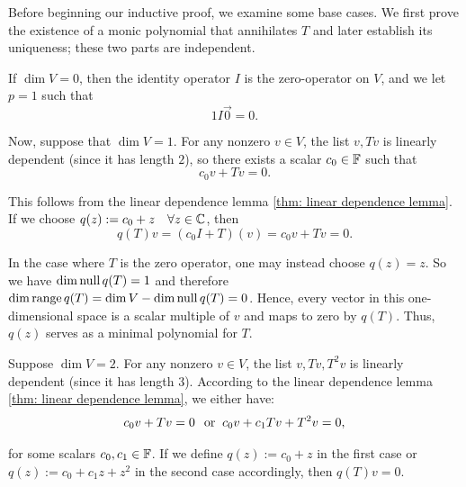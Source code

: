 \begin{prf}
  Before beginning our inductive proof, we examine some base cases. We first prove the existence of a monic polynomial that annihilates $T$ and later establish its uniqueness; these two parts are independent.


   If $\dim V=0$, then the identity operator $I$ is the zero-operator on $V$, and we let $p=1$ such that
  \begin{equation}
      1I\vec0=0.
  \end{equation}

   Now, suppose that $\dim V=1$. For any nonzero $v \in V$, the list $v, Tv$ is linearly dependent (since it has length $2$), so there exists a scalar $c_0 \in \mathbb{F}$ such that
  \begin{equation}
    c_0v + Tv = 0.
  \end{equation}

  This follows from the linear dependence lemma \ref{thm: linear dependence lemma}. If we choose $q(z) := c_0+z \quad \forall z \in \mathbb{C}$, then
  \begin{equation}
    q(T)v=(c_0 I+T)(v)=c_0v+Tv=0.
  \end{equation}

  In the case where $T$ is the zero operator, one may instead choose $q(z) = z$. So we have $\dim \operatorname{null} q(T) = 1$ and therefore $\dim \operatorname{range} q(T) = \dim V - \dim \operatorname{null} q(T) = 0$. Hence, every vector in this one-dimensional space is a scalar multiple of $v$ and maps to zero by $q(T)$. Thus, $q(z)$ serves as a minimal polynomial for $T$.

   Suppose $\dim V=2$. For any nonzero $v \in V$, the list $v, Tv, T^2v$ is linearly dependent (since it has length $3$). According to the linear dependence lemma \ref{thm: linear dependence lemma}, we either have:
  \begin{equation}
     c_0v + Tv = 0 \;\;\, \text{or}\;\;
     c_0v + c_1Tv + T^2v = 0,
  \end{equation}

  for some scalars $c_0, c_1 \in  \mathbb{F}$. If we define $q(z) := c_0+z$ in the first case or $q(z) := c_0+c_1z+z^2$ in the second case accordingly, then $q(T)v=0$.


\end{prf}
